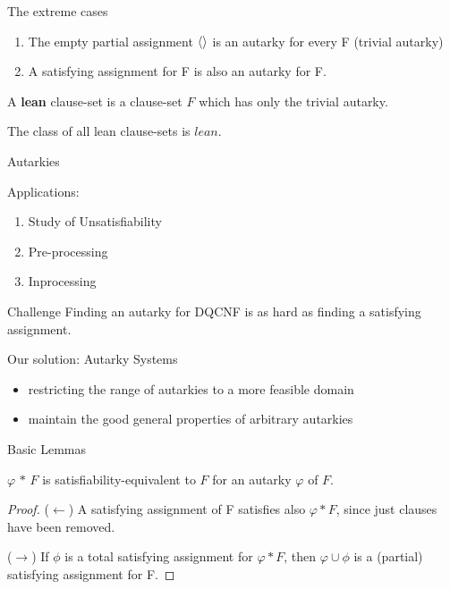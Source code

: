 \documentclass[xcolor=table	]{beamer}
\DeclarePairedDelimiter\ev{\langle}{\rangle}%
\begin{document}
\begin{frame}{The extreme cases}

\begin{enumerate}
	\item The empty partial assignment $\ev{}$ is an autarky for every F \newline (trivial autarky)
	
	\item A satisfying assignment for F is also an autarky for F. \newline
\end{enumerate}

A \textbf{lean} clause-set is a clause-set $F$ which has
only the trivial autarky. \newline 

The class of all lean clause-sets is $lean$.

\end{frame}


\begin{frame}{Autarkies}

Applications: 
\begin{enumerate}
    \item Study of Unsatisfiability
    \item Pre-processing 
    \item Inprocessing
\end{enumerate}

 \begin{exampleblock}{Challenge}
 Finding an autarky for DQCNF is as hard as finding a satisfying assignment.
\end{exampleblock}
    
  \begin{alertblock}{Our solution: Autarky Systems}
  \begin{itemize}
      \item restricting the range of autarkies to a more feasible domain
      \item maintain the good general properties of arbitrary autarkies
  \end{itemize}
 
  \end{alertblock}

\end{frame}

\begin{frame}{Basic Lemmas}
 \begin{lemma}[1]
   $\varphi$ $\ast$ $F$ is satisfiability-equivalent to $F$ for an autarky $\varphi$ of $F$.
 \end{lemma}
 \begin{proof}
 	($\leftarrow$) A satisfying assignment of F satisfies also
 	$\varphi \ast F$, since just clauses have been removed. 
 	
 	 ($\to$) If $\phi$ is a total satisfying assignment for $\varphi \ast F$, then $\varphi \cup \phi$ is a (partial) satisfying assignment for F.
 \end{proof}
\end{frame}
\end{document}

